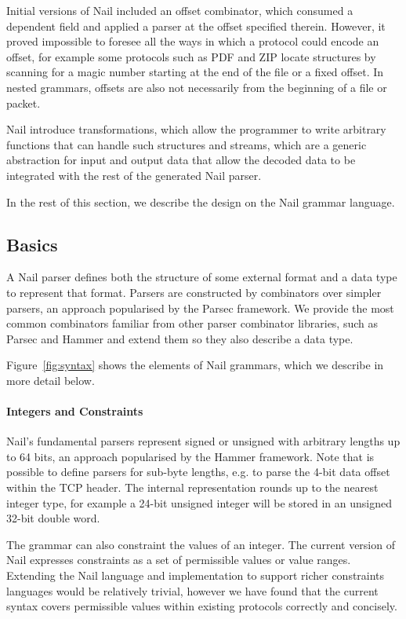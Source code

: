 Initial versions of Nail included an offset combinator, which consumed a dependent field and applied
a parser at the offset specified therein. However, it proved impossible to foresee all the ways in which a protocol could encode an offset, for example
some protocols such as PDF and ZIP locate structures by scanning for a magic number starting at the
end of the file or a fixed offset. In nested grammars, offsets are also not necessarily from
the beginning of a file or packet.

Nail introduce transformations, which allow the programmer to write arbitrary functions that can
handle such structures and streams, which are a generic abstraction for input and output data that
allow the decoded data to be integrated with the rest of the generated Nail parser.

In the rest of this section, we describe the design on the Nail grammar language.

\subsection{Basics}
A Nail parser defines both the structure of some external format and a data type to represent that
format. Parsers are constructed by combinators over simpler parsers, an approach popularised by the Parsec
framework\cite{LeijenMeijer:parsec}. We provide the most common combinators familiar from other parser
 combinator libraries, such as Parsec and Hammer\cite{hammer-parser} and extend them so they also
 describe a data type. 

Figure~\ref{fig:syntax} shows the elements of Nail grammars, which we describe in more detail below.
\paragraph{Integers and Constraints}

Nail's fundamental parsers represent signed or unsigned with arbitrary lengths up to 64 bits, an
approach popularised by the Hammer framework.\cite{hammer-parser}  
Note that is possible to define parsers for sub-byte lengths, e.g. to parse the 4-bit
data offset within the TCP header.  The internal representation rounds up to the nearest integer
type, for example a 24-bit unsigned integer will be stored in an unsigned 32-bit double word.

The grammar can also constraint the values of an integer. The current version of Nail expresses
constraints as a set of permissible values or value ranges. Extending the Nail language and
implementation to support richer constraints languages would be relatively trivial, however we have
found that the current syntax covers permissible values within existing protocols correctly and
concisely.


